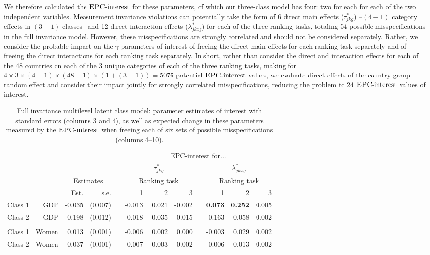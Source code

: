 \documentclass[letterpaper,12pt]{article}
\newcommand{\da}{\textrm{{\sc {EPC}}-interest}}
\begin{document}
We therefore calculated the $\da{}$ for these parameters, of which our three-class model has four: two for each for each of the two independent variables. Measurement invariance violations can potentially take the form of 6 direct main effects ($\tau^{*}_{j k g}$) --$(4-1)$ category effects in $(3-1)$ classes--  and 12 direct interaction effects ($\lambda^{*}_{j k x g}$) for each of the three ranking tasks, totaling 54 possible misspecifications in the full invariance model. However, these misspecifications are strongly correlated and should not be considered separately. Rather, we consider the probable impact on the $\gamma$ parameters of interest of freeing the direct main effects for each ranking task separately and of freeing the  direct interactions for each ranking task separately. In short, rather than consider the direct and interaction effects for each of the 48 countries on each of the 3 unique categories of each of the three ranking tasks, making for $4 \times 3 \times (4 - 1)\times  (48 - 1) \times(1 + (3 - 1)) = 5076$ potential $\da{}$ values, we evaluate direct effects of the country group random effect and consider their impact jointly for strongly correlated misspecifications, reducing the problem to 24 $\da{}$ values of interest.


\begin{table}
	\begin{tabular}{lrrrrrrrrrrr}
	\hline
		&&&&&\multicolumn{7}{c}{EPC-interest for...}\\
	&&&&&\multicolumn{3}{c}{$\tau^{*}_{j k g}$} && \multicolumn{3}{c}{$\lambda^{*}_{j k x g}$}\\
			\hline
		&&\multicolumn{2}{c}{Estimates}&&\multicolumn{3}{c}{Ranking task} && \multicolumn{3}{c}{Ranking task}\\
\cline{3-4}\cline{6-8}\cline{10-12}
			&	&	Est.&	s.e.&	&	1  &	2  &	3  &&	  1&	2 &	3\\
				\hline
Class	1&	GDP&	-0.035&	(0.007)&	&	-0.013&	0.021&	-0.002&&	\textbf{0.073}&	\textbf{0.252}&	0.005\\
Class	2&	GDP&	-0.198&	(0.012)&	&	-0.018&	-0.035&	0.015&&	-0.163&	-0.058&	0.002\\
\\
Class	1&	Women&	0.013&	(0.001)&	&	-0.006&	0.002&	0.000&&	-0.003&	0.029&	0.002\\
Class	2&	Women&	-0.037&	(0.001)&	&	0.007&	-0.003&	0.002&&	-0.006&	-0.013&	0.002\\
	\hline
\end{tabular}
	\caption{Full invariance multilevel latent class model: parameter estimates of interest with standard errors (columns 3 and 4), as well as expected change in these parameters measured by the  $\da{}$ when freeing each of six sets of possible misspecifications (columns 4--10). \label{tab:epc-interest-model1}}
\end{table}
\end{document}
